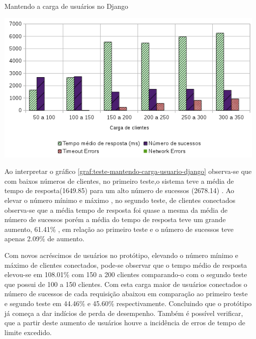   \begin{grafico}[H]
    \setlength{\abovecaptionskip}{5pt}
    \setlength{\belowcaptionskip}{0pt}
    \label{graf:teste-mantendo-carga-usuario-django}
    \caption[Mantendo a carga de usuários no Django]
	    {Mantendo a carga de usuários no Django}
    \centering
    \includegraphics[width=.80\textwidth]{imagem/graficos/grafico_django_plano_de_teste_3.png}
    \captionsetup[grafico]{justification=centering}
  \end{grafico}
  
  Ao interpretar o gráfico \ref{graf:teste-mantendo-carga-usuario-django}  observa-se que com baixos números de clientes, no primeiro
  teste,o sistema teve a média de tempo de resposta(1649.85) para um alto número de sucessos (2678.14) . Ao elevar o número mínimo e máximo
  , no segundo teste, de clientes conectados observa-se que a média tempo de resposta foi quase a mesma da média de número de sucessos porém 
  a média do tempo de resposta teve um grande aumento, 61.41\% , em relação ao primeiro teste e o número de sucessos teve apenas 
  2.09\% de aumento.

  Com novos acréscimos de usuários no protótipo, elevando o número mínimo e máximo de clientes conectados, pode-se observar que o 
  tempo médio de resposta elevou-se em 108.01\% com 150 a 200 clientes comparando-o com o segundo teste que possui de 100 a 150 clientes.
  Com esta carga maior de usuários conectados o número de sucessos de cada requisição abaixou em comparação ao primeiro teste e segundo
  teste em 44.46\% e 45.60\% respectivamente. Concluindo que o protótipo já começa a dar indícios de perda de desempenho. Também é possível
  verificar, que a partir deste aumento de usuários houve a incidência de erros de tempo de limite excedido.
  
